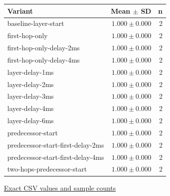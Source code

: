 \begin{center}{\scriptsize\setlength{\tabcolsep}{3pt}
\begin{tabular}{lrr}
\toprule
Variant & Mean $\pm$ SD & n \\
\midrule
baseline-layer-start & $1.000\pm0.000$ & 2 \\
first-hop-only & $1.000\pm0.000$ & 2 \\
first-hop-only-delay-2ms & $1.000\pm0.000$ & 2 \\
first-hop-only-delay-4ms & $1.000\pm0.000$ & 2 \\
layer-delay-1ms & $1.000\pm0.000$ & 2 \\
layer-delay-2ms & $1.000\pm0.000$ & 2 \\
layer-delay-3ms & $1.000\pm0.000$ & 2 \\
layer-delay-4ms & $1.000\pm0.000$ & 2 \\
layer-delay-6ms & $1.000\pm0.000$ & 2 \\
predecessor-start & $1.000\pm0.000$ & 2 \\
predecessor-start-first-delay-2ms & $1.000\pm0.000$ & 2 \\
predecessor-start-first-delay-4ms & $1.000\pm0.000$ & 2 \\
two-hops-predecessor-start & $1.000\pm0.000$ & 2 \\
\bottomrule\end{tabular}}
{\footnotesize\href{https://github.com/sanjeevkrishnaa/Compiler-Driven-ACE/blob/codex/ace-scheduler-correctness/docs/latex/qft96_final/data/variants_mesh_xy_completion_rate.csv}{Exact CSV values and sample counts}}
\end{center}
